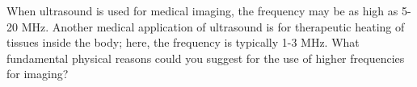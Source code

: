 When ultrasound is used for medical imaging, the
frequency may be as high as 5-20 MHz. Another medical
application of ultrasound is for therapeutic heating of
tissues inside the body; here, the frequency is typically
1-3 MHz. What fundamental physical reasons could you suggest
for the use of higher frequencies for imaging?
